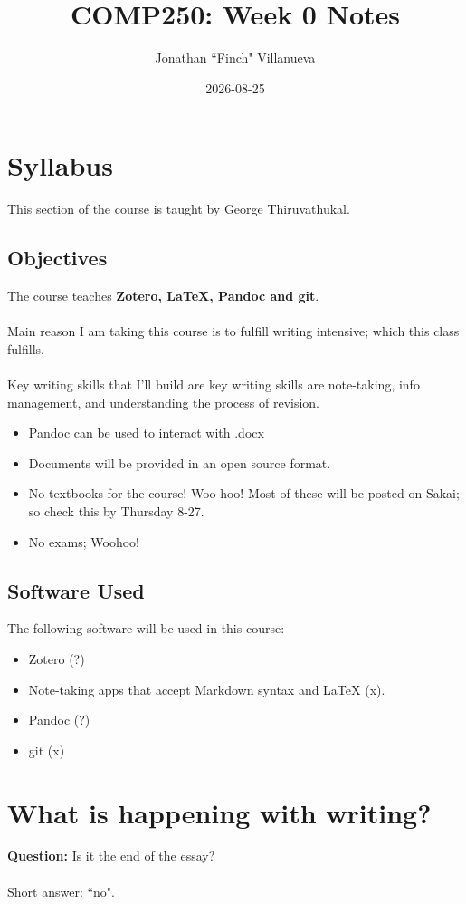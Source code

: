 \documentclass{article}
\title{COMP250: Week 0 Notes}
\author{Jonathan ``Finch" Villanueva}
\date{2026-08-25}
\begin{document}
\maketitle
\noindent
\section{Syllabus}
This section of the course is taught by George Thiruvathukal.

\subsection{Objectives}
The course teaches \textbf{Zotero, LaTeX, Pandoc and git}.
\\\\
Main reason I am taking this course is to fulfill writing
intensive; which this class fulfills.
\\\\
Key writing skills that I'll build are key writing skills are 
note-taking, info management, and understanding the process of revision.

\begin{itemize}
  \item Pandoc can be used to interact with .docx
  \item Documents will be provided in an open source format.
  \item No textbooks for the course! Woo-hoo! Most of these will be
    posted on Sakai; so check this by Thursday 8-27.
  \item No exams; Woohoo!
\end{itemize}
\subsection{Software Used}
The following software will be used in this course:
\begin{itemize}
  \item Zotero (?)
  \item Note-taking apps that accept Markdown syntax and LaTeX (x).
  \item Pandoc (?)
  \item git (x)
\end{itemize}
\section{What is happening with writing?}
\textbf{Question:} Is it the end of the essay?
\\\\
Short answer: ``no".
\end{document}
